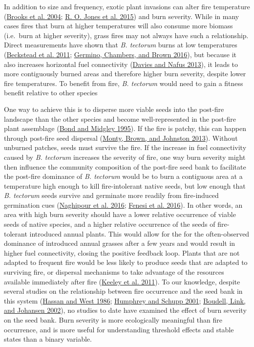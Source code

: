 \documentclass[
  12pt,
]{article}
\begin{document}
In addition to size and frequency, exotic plant invasions can alter fire
temperature (\protect\hyperlink{ref-Brooks2004}{Brooks et al. 2004};
\protect\hyperlink{ref-Jones2015}{R. O. Jones et al. 2015}) and burn
severity. While in many cases fires that burn at higher temperatures
will also consume more biomass (i.e.~burn at higher severity), grass
fires may not always have such a relationship. Direct measurements have
shown that \emph{B. tectorum} burns at low temperatures
(\protect\hyperlink{ref-Beckstead2011}{Beckstead et al. 2011};
\protect\hyperlink{ref-Germino2016}{Germino, Chambers, and Brown 2016}),
but because it also increases horizontal fuel connectivity
(\protect\hyperlink{ref-Davies2013}{Davies and Nafus 2013}), it leads to
more contiguously burned areas and therefore higher burn severity,
despite lower fire temperatures. To benefit from fire, \emph{B.
tectorum} would need to gain a fitness benefit relative to other species

One way to achieve this is to disperse more viable seeds into the
post-fire landscape than the other species and become well-represented
in the post-fire plant assemblage (\protect\hyperlink{ref-Bond1995}{Bond
and Midgley 1995}). If the fire is patchy, this can happen through
post-fire seed dispersal (\protect\hyperlink{ref-Monty2013}{Monty,
Brown, and Johnston 2013}). Without unburned patches, seeds must survive
the fire. If the increase in fuel connectivity caused by \emph{B.
tectorum} increases the severity of fire, one way burn severity might
then influence the community composition of the post-fire seed bank to
facilitate the post-fire dominance of \emph{B. tectorum} would be to
burn a contiguous area at a temperature high enough to kill
fire-intolerant native seeds, but low enough that \emph{B. tectorum}
seeds survive and germinate more readily from fire-induced germination
cues (\protect\hyperlink{ref-Naghipour2016}{Naghipour et al. 2016};
\protect\hyperlink{ref-Fenesi2016}{Fenesi et al. 2016}). In other words,
an area with high burn severity should have a lower relative occurrence
of viable seeds of native species, and a higher relative occurrence of
the seeds of fire-tolerant introduced annual plants. This would allow
for the for the often-observed dominance of introduced annual grasses
after a few years and would result in higher fuel connectivity, closing
the positive feedback loop. Plants that are not adapted to frequent fire
would be less likely to produce seeds that are adapted to surviving
fire, or dispersal mechanisms to take advantage of the resources
available immediately after fire
(\protect\hyperlink{ref-Keeley2011}{Keeley et al. 2011}). To our
knowledge, despite several studies on the relationship between fire
occurrence and the seed bank in this system
(\protect\hyperlink{ref-Hassan1986}{Hassan and West 1986};
\protect\hyperlink{ref-Humphrey2001}{Humphrey and Schupp 2001};
\protect\hyperlink{ref-Boudell2002}{Boudell, Link, and Johansen 2002}),
no studies to date have examined the effect of burn severity on the seed
bank. Burn severity is more ecologically meaningful than fire
occurrence, and is more useful for understanding threshold effects and
stable states than a binary variable.
\end{document}
